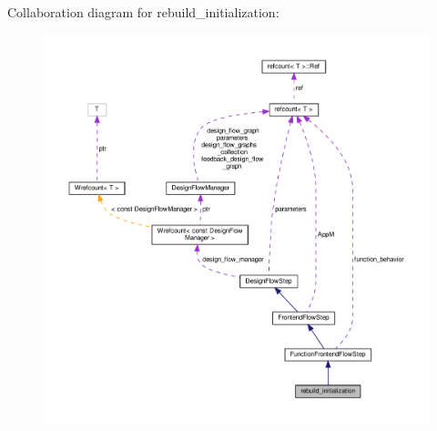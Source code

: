 Collaboration diagram for rebuild\+\_\+initialization\+:
\nopagebreak
\begin{figure}[H]
\begin{center}
\leavevmode
\includegraphics[width=350pt]{df/d38/classrebuild__initialization__coll__graph}
\end{center}
\end{figure}
